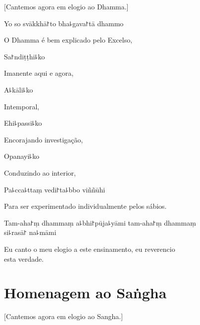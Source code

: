 \begin{english}
  [Cantemos agora em elogio ao Dhamma.]
\end{english}

Yo so svākkhā꜓to bha꜕gava꜓tā dhammo

\begin{english}
  O Dhamma é bem explicado pelo Excelso,
\end{english}

Sa꜓ndiṭṭhi꜕ko

\begin{english}
  Imanente aqui e agora,
\end{english}

A꜕kāli꜕ko

\begin{english}
  Intemporal,
\end{english}

Ehi꜕passi꜕ko

\begin{english}
  Encorajando investigação,
\end{english}

Opanayi꜕ko

\begin{english}
  Conduzindo ao interior,
\end{english}

Pa꜕cca꜕ttaṃ vedi꜓ta꜕bbo viññūhi

\begin{english}
  Para ser experimentado individualmente pelos sábios.
\end{english}

Tam-aha꜓ṃ dhammaṃ a꜕bhi꜓pūja꜕yāmi tam-aha꜓ṃ dhammaṃ \\si꜕rasā꜓ na꜕māmi

\begin{english}
  Eu canto o meu elogio a este ensinamento, eu reverencio\\ esta verdade.
\end{english}

\clearpage

\chapter{Homenagem ao Saṅgha}

\begin{leader}
\end{leader}

\begin{english}
  [Cantemos agora em elogio ao Sangha.]
\end{english}

